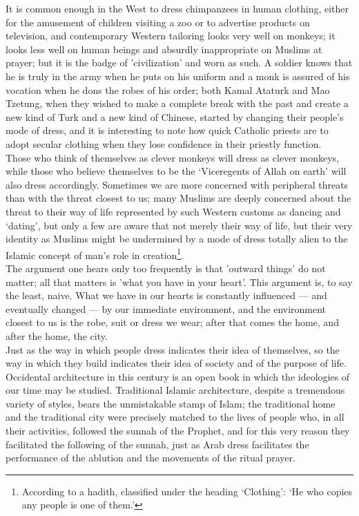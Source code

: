 \documentclass[10pt, twoside]{book}
\begin{document}
It is common enough in the West to dress chimpanzees in human clothing, either for the amusement of 
children visiting a zoo or to advertise products on television, and contemporary Western tailoring 
looks very well on monkeys; it looks less well on human beings and absurdly inappropriate on Muslims 
at prayer; but it is the badge of 'civilization' and worn as such. A soldier knows that he is truly 
in the army when he puts on his uniform and a monk is assured of his vocation when he dons the robes 
of his order; both Kamal Ataturk and Mao Tzetung, when they wished to make a complete break with the 
past and create a new kind of Turk and a new kind of Chinese, started by changing their people's mode 
of dress, and it is interesting to note how quick Catholic priests are to adopt secular clothing when 
they lose confidence in their priestly function. \\

Those who think of themselves as clever monkeys will dress as clever monkeys, while those who believe 
themselves to be the `Viceregents of Allah on earth' will also dress accordingly. Sometimes we are 
more concerned with peripheral threats than with the threat closest to us; many Muslims are deeply 
concerned about the threat to their way of life represented by such Western customs as dancing and 
`dating', but only a few are aware that not merely their way of life, but their very identity as 
Muslims might be undermined by a mode of dress totally alien to the Islamic concept of man's role in 
creation\footnote{According to a hadith, classified under the heading `Clothing': `He who copies any people is one of them.'}. \\

The argument one hears only too frequently is that 'outward things' do not matter; all that matters 
is 'what you have in your heart'. This argument is, to say the least, naive. What we have in our 
hearts is constantly influenced --- and eventually changed --- by our immediate environment, and the 
environment closest to us is the robe, suit or dress we wear; after that comes the home, and after 
the home, the city. \\

Just as the way in which people dress indicates their idea of themselves, so the way in which they 
build indicates their idea of society and of the purpose of life. Occidental architecture in this 
century is an open book in which the ideologies of our time may be studied. Traditional Islamic 
architecture, despite a tremendous variety of styles, bears the unmistakable stamp of Islam; the 
traditional home and the traditional city were precisely matched to the lives of people who, in all 
their activities, followed the sunnah of the Prophet, and for this very reason they facilitated the 
following of the sunnah, just as Arab dress facilitates the performance of the ablution and the 
movements of the ritual prayer. \\
\end{document}
